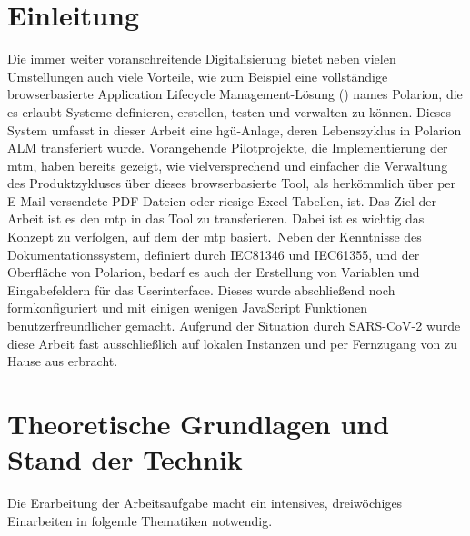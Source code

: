\chapter{Einleitung}
\label{cha:einleitung}
\pagestyle{scrheadings}
Die immer weiter voranschreitende Digitalisierung bietet neben vielen Umstellungen auch viele Vorteile, wie zum Beispiel eine vollständige browserbasierte Application Lifecycle Management-Lösung (\cite{1}) names Polarion, die es erlaubt Systeme definieren, erstellen, testen und verwalten zu können. Dieses System umfasst in dieser Arbeit eine \ac{hgü}-Anlage, deren Lebenszyklus in Polarion ALM transferiert wurde. Vorangehende Pilotprojekte, die Implementierung der \ac{mtm}, haben bereits gezeigt, wie vielversprechend und einfacher die Verwaltung des Produktzykluses über dieses browserbasierte Tool, als herkömmlich über per E-Mail versendete PDF Dateien oder riesige Excel-Tabellen, ist. Das Ziel der Arbeit ist es den \ac{mtp} in das Tool zu transferieren. Dabei ist es wichtig das Konzept zu verfolgen, auf dem der \ac{mtp} basiert.\
Neben der Kenntnisse des Dokumentationssystem, definiert durch IEC81346 und IEC61355, und der Oberfläche von Polarion, bedarf es auch der Erstellung von Variablen und Eingabefeldern für das Userinterface. Dieses wurde abschließend noch formkonfiguriert und mit einigen wenigen JavaScript Funktionen benutzerfreundlicher gemacht. Aufgrund der Situation durch SARS-CoV-2 wurde diese Arbeit fast ausschließlich auf lokalen Instanzen und per Fernzugang von zu Hause aus erbracht.\\
\chapter{Theoretische Grundlagen und Stand der Technik}
\label{cha:theo}
Die Erarbeitung der Arbeitsaufgabe macht ein intensives, dreiwöchiges Einarbeiten in folgende Thematiken notwendig.
